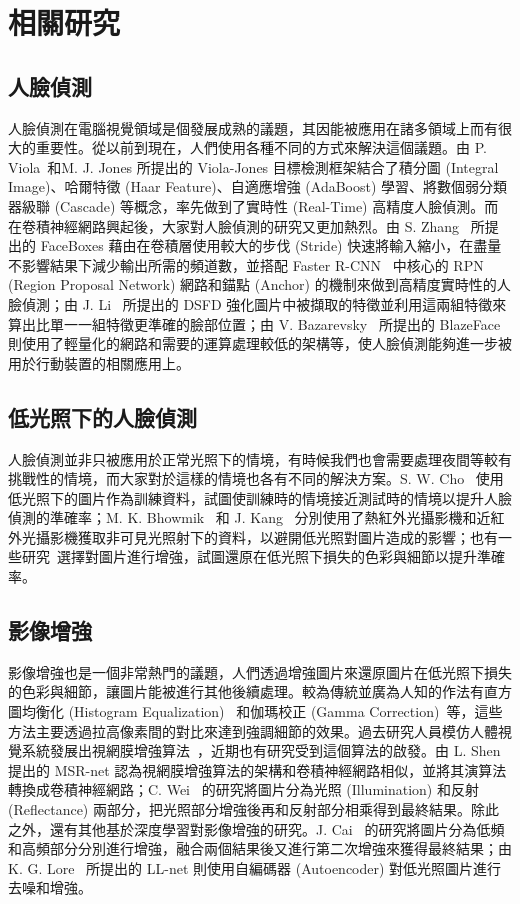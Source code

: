 \chapter{相關研究}
\label{c:related}

\section{人臉偵測}
人臉偵測在電腦視覺領域是個發展成熟的議題，其因能被應用在諸多領域上而有很大的重要性。從以前到現在，人們使用各種不同的方式來解決這個議題。由 P. Viola~和M. J. Jones\cite{viola2004robust} 所提出的 Viola-Jones 目標檢測框架結合了積分圖 (Integral Image)、哈爾特徵 (Haar Feature)、自適應增強 (AdaBoost) 學習、將數個弱分類器級聯 (Cascade) 等概念，率先做到了實時性 (Real-Time) 高精度人臉偵測。而在卷積神經網路興起後，大家對人臉偵測的研究又更加熱烈。由 S. Zhang~\cite{zhang2017faceboxes} 所提出的 FaceBoxes 藉由在卷積層使用較大的步伐 (Stride) 快速將輸入縮小，在盡量不影響結果下減少輸出所需的頻道數，並搭配 Faster R-CNN~\cite{ren2015faster} 中核心的 RPN (Region Proposal Network) 網路和錨點 (Anchor) 的機制來做到高精度實時性的人臉偵測；由 J. Li~\cite{li2019dsfd} 所提出的 DSFD 強化圖片中被擷取的特徵並利用這兩組特徵來算出比單一一組特徵更準確的臉部位置；由 V. Bazarevsky~\cite{bazarevsky2019blazeface} 所提出的 BlazeFace 則使用了輕量化的網路和需要的運算處理較低的架構等，使人臉偵測能夠進一步被用於行動裝置的相關應用上。

\section{低光照下的人臉偵測}
人臉偵測並非只被應用於正常光照下的情境，有時候我們也會需要處理夜間等較有挑戰性的情境，而大家對於這樣的情境也各有不同的解決方案。S. W. Cho~\cite{cho2018face} 使用低光照下的圖片作為訓練資料，試圖使訓練時的情境接近測試時的情境以提升人臉偵測的準確率；M. K. Bhowmik~\cite{bhowmik2011thermal} 和 J. Kang~\cite{kang2015face} 分別使用了熱紅外光攝影機和近紅外光攝影機獲取非可見光照射下的資料，以避開低光照對圖片造成的影響；也有一些研究~\cite{cho2018face, li2017real, yang2020advancing}選擇對圖片進行增強，試圖還原在低光照下損失的色彩與細節以提升準確率。

\section{影像增強}
影像增強也是一個非常熱門的議題，人們透過增強圖片來還原圖片在低光照下損失的色彩與細節，讓圖片能被進行其他後續處理。較為傳統並廣為人知的作法有直方圖均衡化 (Histogram Equalization)~\cite{gonzales2002digital} 和伽瑪校正 (Gamma Correction)~\cite{gonzales2002digital}等，這些方法主要透過拉高像素間的對比來達到強調細節的效果。過去研究人員模仿人體視覺系統發展出視網膜增強算法~\cite{land1977retinex}，近期也有研究受到這個算法的啟發。由 L. Shen~\cite{shen2017msr} 提出的 MSR-net 認為視網膜增強算法的架構和卷積神經網路相似，並將其演算法轉換成卷積神經網路；C. Wei~\cite{wei2018deep} 的研究將圖片分為光照 (Illumination) 和反射 (Reflectance) 兩部分，把光照部分增強後再和反射部分相乘得到最終結果。除此之外，還有其他基於深度學習對影像增強的研究。J. Cai~\cite{cai2018learning} 的研究將圖片分為低頻和高頻部分分別進行增強，融合兩個結果後又進行第二次增強來獲得最終結果；由K. G. Lore~\cite{lore2017llnet} 所提出的 LL-net 則使用自編碼器 (Autoencoder) 對低光照圖片進行去噪和增強。
